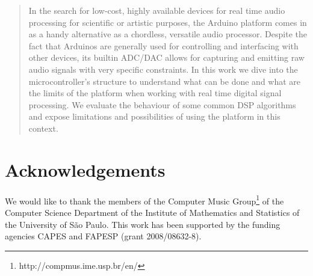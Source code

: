 \begin{abstract}


In the search for low-cost, highly available devices for real time audio
processing for scientific or artistic purposes, the Arduino platform comes in
as a handy alternative as a chordless, versatile audio processor. Despite the
fact that Arduinos are generally used for controlling and interfacing with
other devices, its builtin ADC/DAC allows for capturing and emitting raw audio
signals with very specific constraints. In this work we dive into the
microcontroller's structure to understand what can be done and what are the
limits of the platform when working with real time digital signal processing.
We evaluate the behaviour of some common DSP algorithms and expose limitations
and possibilities of using the platform in this context.


\end{abstract}






\section{Acknowledgements}

We would like to thank the members of the Computer Music
Group\footnote{http://compmus.ime.usp.br/en/} of the Computer Science
Department of the Institute of Mathematics and Statistics of the University of
São Paulo. This work has been supported by the funding agencies CAPES and
FAPESP (grant 2008/08632-8).


%
\nocite{*}
%
%
%


